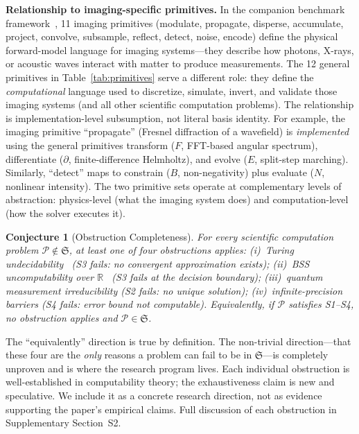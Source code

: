\documentclass[11pt,a4paper]{article}
\newtheorem{conjecture}[definition]{Conjecture}
\newcommand{\R}{\mathbb{R}}
\newcommand{\Sclass}{\mathfrak{S}}
\begin{document}
\textbf{Relationship to imaging-specific primitives.} In the companion benchmark framework~\cite{yang2026pwm}, 11 imaging primitives (modulate, propagate, disperse, accumulate, project, convolve, subsample, reflect, detect, noise, encode) define the physical forward-model language for imaging systems---they describe how photons, X-rays, or acoustic waves interact with matter to produce measurements. The 12 general primitives in Table~\ref{tab:primitives} serve a different role: they define the \emph{computational} language used to discretize, simulate, invert, and validate those imaging systems (and all other scientific computation problems). The relationship is implementation-level subsumption, not literal basis identity. For example, the imaging primitive ``propagate'' (Fresnel diffraction of a wavefield) is \emph{implemented} using the general primitives transform ($F$, FFT-based angular spectrum), differentiate ($\partial$, finite-difference Helmholtz), and evolve ($E$, split-step marching). Similarly, ``detect'' maps to constrain ($B$, non-negativity) plus evaluate ($N$, nonlinear intensity). The two primitive sets operate at complementary levels of abstraction: physics-level (what the imaging system does) and computation-level (how the solver executes it).

\begin{conjecture}[Obstruction Completeness]
\label{conj:obstruction}
For every scientific computation problem $\mathcal{P} \notin \Sclass$, at least one of four obstructions applies: (i)~Turing undecidability~\cite{turing1936} (S3 fails: no convergent approximation exists); (ii)~BSS uncomputability over $\R$~\cite{blum1989} (S3 fails at the decision boundary); (iii)~quantum measurement irreducibility (S2 fails: no unique solution); (iv)~infinite-precision barriers (S4 fails: error bound not computable). Equivalently, if $\mathcal{P}$ satisfies S1--S4, no obstruction applies and $\mathcal{P} \in \Sclass$.
\end{conjecture}

The ``equivalently'' direction is true by definition. The non-trivial direction---that these four are the \emph{only} reasons a problem can fail to be in $\Sclass$---is completely unproven and is where the research program lives. Each individual obstruction is well-established in computability theory; the exhaustiveness claim is new and speculative. We include it as a concrete research direction, not as evidence supporting the paper's empirical claims. Full discussion of each obstruction in Supplementary Section~S2.
\end{document}
